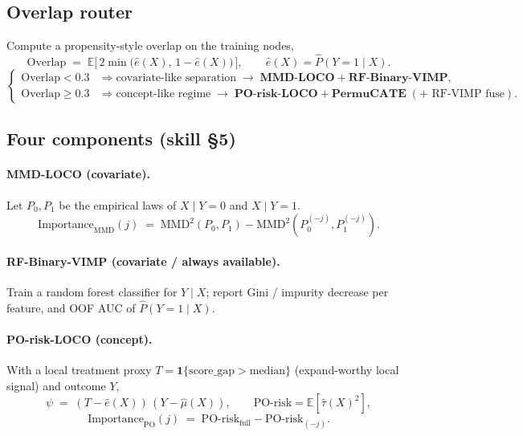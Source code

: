 \documentclass[11pt]{article}
\newcommand{\ind}{\mathbf{1}}
\newcommand{\E}{\mathbb{E}}
\begin{document}
\subsection{Overlap router}
Compute a propensity-style overlap on the training nodes,
\begin{equation}
  \mathrm{Overlap}
  \;=\;
  \E\bigl[\,2\min\bigl(\hat e(X),\,1-\hat e(X)\bigr)\,\bigr],
  \qquad
  \hat e(X)=\widehat{P}(Y{=}1\mid X).
\end{equation}
\begin{equation}
  \begin{cases}
    \mathrm{Overlap}<0.3 & \Rightarrow
      \text{covariate-like separation}\;\to\;
      \textbf{MMD-LOCO} + \textbf{RF-Binary-VIMP},\\[0.25em]
    \mathrm{Overlap}\ge 0.3 & \Rightarrow
      \text{concept-like regime}\;\to\;
      \textbf{PO-risk-LOCO} + \textbf{PermuCATE}
      \;(\text{+ RF-VIMP fuse}).
  \end{cases}
  \label{eq:router}
\end{equation}

\subsection{Four components (skill \S5)}

\paragraph{MMD-LOCO (covariate).}
Let $P_0,P_1$ be the empirical laws of $X\mid Y{=}0$ and $X\mid Y{=}1$.
\begin{equation}
  \mathrm{Importance}_{\mathrm{MMD}}(j)
  \;=\;
  \mathrm{MMD}^2(P_0,P_1)
  -
  \mathrm{MMD}^2(P_0^{(-j)},P_1^{(-j)}).
\end{equation}

\paragraph{RF-Binary-VIMP (covariate / always available).}
Train a random forest classifier for $Y\mid X$; report Gini / impurity
decrease per feature, and OOF AUC of $\widehat{P}(Y{=}1\mid X)$.

\paragraph{PO-risk-LOCO (concept).}
With a local treatment proxy $T=\ind\{\mathrm{score\_gap}>\mathrm{median}\}$
(expand-worthy local signal) and outcome $Y$,
\begin{equation}
  \psi \;=\; (T-\hat e(X))\,(Y-\hat\mu(X)),
  \qquad
  \mathrm{PO\text{-}risk}=\E[\hat\tau(X)^2],
\end{equation}
\begin{equation}
  \mathrm{Importance}_{\mathrm{PO}}(j)
  \;=\;
  \mathrm{PO\text{-}risk}_{\mathrm{full}}
  -
  \mathrm{PO\text{-}risk}_{(-j)}.
\end{equation}
\end{document}
